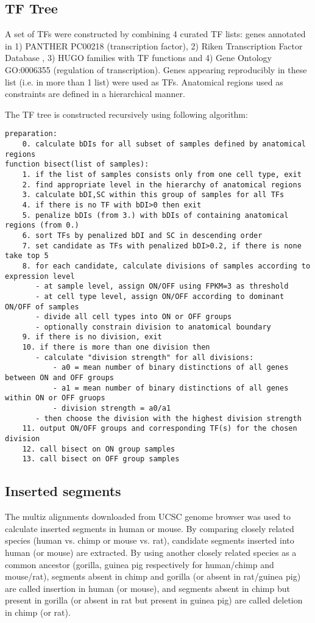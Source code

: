 \subsection{TF Tree}
A set of TFs were constructed by combining 4 curated TF lists: genes annotated in 1) PANTHER \citep{Thomas_2003} PC00218 (transcription factor), 2) Riken Transcription Factor Database \citep{Kanamori_2004}, 3) HUGO \citep{Gray_2014} families with TF functions and 4) Gene Ontology \citep{Ashburner_2000} GO:0006355 (regulation of transcription). Genes appearing reproducibly in these list (i.e. in more than 1 list) were used as TFs. Anatomical regions used as constraints are defined in a hierarchical manner. 

The TF tree is constructed recursively using following algorithm:
\begin{verbatim}
preparation:
    0. calculate bDIs for all subset of samples defined by anatomical regions
function bisect(list of samples):
    1. if the list of samples consists only from one cell type, exit
    2. find appropriate level in the hierarchy of anatomical regions
    3. calculate bDI,SC within this group of samples for all TFs
    4. if there is no TF with bDI>0 then exit
    5. penalize bDIs (from 3.) with bDIs of containing anatomical regions (from 0.)
    6. sort TFs by penalized bDI and SC in descending order
    7. set candidate as TFs with penalized bDI>0.2, if there is none take top 5
    8. for each candidate, calculate divisions of samples according to expression level
       - at sample level, assign ON/OFF using FPKM=3 as threshold
       - at cell type level, assign ON/OFF according to dominant ON/OFF of samples
       - divide all cell types into ON or OFF groups
       - optionally constrain division to anatomical boundary
    9. if there is no division, exit
    10. if there is more than one division then
       - calculate "division strength" for all divisions:
           - a0 = mean number of binary distinctions of all genes between ON and OFF groups
           - a1 = mean number of binary distinctions of all genes within ON or OFF gruops
           - division strength = a0/a1
       - then choose the division with the highest division strength
    11. output ON/OFF groups and corresponding TF(s) for the chosen division
    12. call bisect on ON group samples
    13. call bisect on OFF group samples
\end{verbatim}

\subsection{Inserted segments}
The multiz alignments downloaded from UCSC genome browser \citep{Kent_2002} was used to calculate inserted segments in human or mouse. By comparing closely related species (human vs. chimp or mouse vs. rat), candidate segments inserted into human (or mouse) are extracted. By using another closely related species as a common ancestor (gorilla, guinea pig respectively for human/chimp and mouse/rat), segments absent in chimp and gorilla (or absent in rat/guinea pig) are called insertion in human (or mouse), and segments absent in chimp but present in gorilla (or absent in rat but present in guinea pig) are called deletion in chimp (or rat). 


